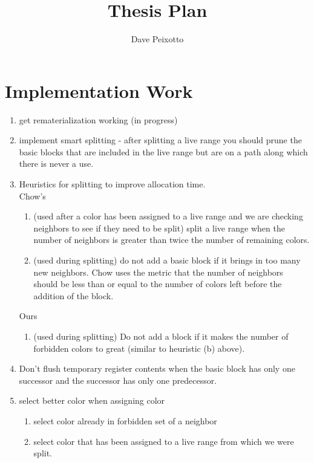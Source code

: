 \documentclass[11pt]{article}
\title{Thesis Plan}
\author{Dave Peixotto}
\begin{document}
\maketitle


\section{Implementation Work}
\begin{enumerate}
\item get rematerialization working (in progress)

\item implement smart splitting - after splitting a live range you
should prune the basic blocks that are included in the live range but
are on a path along which there is never a use.

\item Heuristics for splitting to improve allocation time.\\
  Chow's 
  \begin{enumerate}
  \item (used after a color has been assigned to a live range and we
  are checking neighbors to see if they need to be split) 
  split a live range when the number of neighbors is greater than
  twice the number of remaining colors.
  \item (used during splitting) do not add a basic block if it brings
  in too many new neighbors. Chow uses the metric that the number of
  neighbors should be less than or equal to the number of colors left
  before the addition of the block.
  \end{enumerate}
  Ours
  \begin{enumerate}
  \item (used during splitting) Do not add a block if it makes the
  number of forbidden colors to great (similar to heuristic (b)
  above).
  \end{enumerate}



\item Don't flush temporary register contents when the basic block has
only one successor and the successor has only one predecessor.

\item select better color when assigning color
  \begin{enumerate}
  \item select color already in forbidden set of a neighbor
  \item select color that has been assigned to a live range from which
  we were split.
  \end{enumerate}


\end{enumerate}
\end{document}
